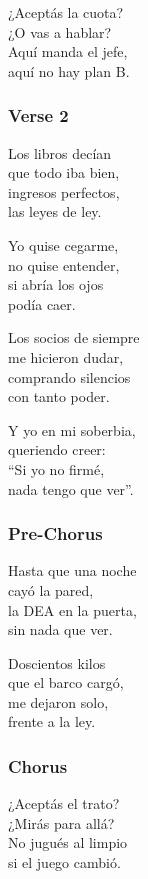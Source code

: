 ¿Aceptás la cuota?\\
¿O vas a hablar?\\
Aquí manda el jefe,\\
aquí no hay plan B.

\subsubsection{Verse 2}\label{verse-2-19}

Los libros decían\\
que todo iba bien,\\
ingresos perfectos,\\
las leyes de ley.

Yo quise cegarme,\\
no quise entender,\\
si abría los ojos\\
podía caer.

Los socios de siempre\\
me hicieron dudar,\\
comprando silencios\\
con tanto poder.

Y yo en mi soberbia,\\
queriendo creer:\\
``Si yo no firmé,\\
nada tengo que ver''.

\subsubsection{Pre-Chorus}\label{pre-chorus-45}

Hasta que una noche\\
cayó la pared,\\
la DEA en la puerta,\\
sin nada que ver.

Doscientos kilos\\
que el barco cargó,\\
me dejaron solo,\\
frente a la ley.

\subsubsection{Chorus}\label{chorus-63}

¿Aceptás el trato?\\
¿Mirás para allá?\\
No jugués al limpio\\
si el juego cambió.

